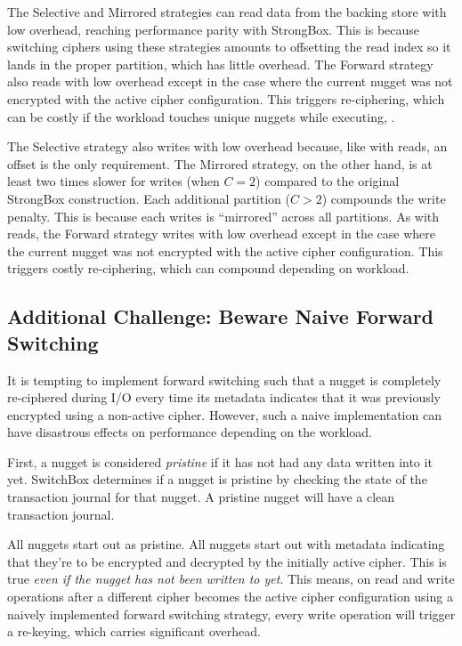 The Selective and Mirrored strategies can read data from the backing store with
low overhead, reaching performance parity with StrongBox. This is because
switching ciphers using these strategies amounts to offsetting the read index so
it lands in the proper partition, which has little overhead. The Forward
strategy also reads with low overhead except in the case where the current
nugget was not encrypted with the active cipher configuration. This triggers
re-ciphering, which can be costly if the workload touches unique nuggets while
executing, .

The Selective strategy also writes with low overhead because, like with reads,
an offset is the only requirement. The Mirrored strategy, on the other hand, is
at least two times slower for writes (when $C = 2$) compared to the original
StrongBox construction. Each additional partition ($C > 2$) compounds the write
penalty. This is because each writes is ``mirrored'' across all partitions. As
with reads, the Forward strategy writes with low overhead except in the case
where the current nugget was not encrypted with the active cipher configuration.
This triggers costly re-ciphering, which can compound depending on workload.

\subsection{Additional Challenge: Beware Naive Forward Switching}

It is tempting to implement forward switching such that a nugget is completely
re-ciphered during I/O every time its metadata indicates that it was previously
encrypted using a non-active cipher. However, such a naive implementation can
have disastrous effects on performance depending on the workload.

First, a nugget is considered \emph{pristine} if it has not had any data written
into it yet. SwitchBox determines if a nugget is pristine by checking the state
of the transaction journal for that nugget. A pristine nugget will have a clean
transaction journal.

All nuggets start out as pristine. All nuggets start out with metadata
indicating that they're to be encrypted and decrypted by the initially active
cipher. This is true \emph{even if the nugget has not been written to yet}. This
means, on read and write operations after a different cipher becomes the active
cipher configuration using a naively implemented forward switching strategy,
every write operation will trigger a re-keying, which carries significant
overhead.

